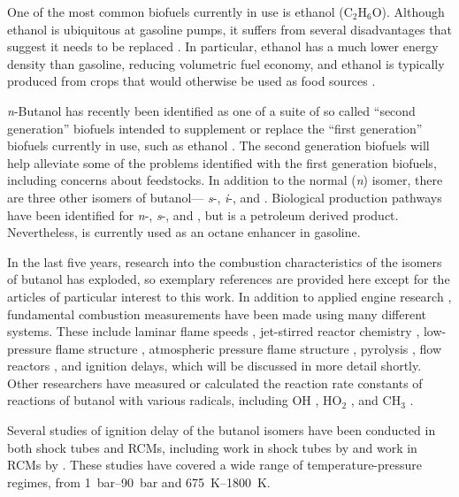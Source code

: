 \documentclass[../main.tex]{subfiles}
\begin{document}
One of the most common biofuels currently in use is ethanol (C$_2$H$_6$O).
Although ethanol is ubiquitous at gasoline pumps, it suffers from several
disadvantages that suggest it needs to be replaced \cite{Niven2005}. In particular, ethanol
has a much lower energy density than gasoline, reducing volumetric fuel
economy, and ethanol is typically produced from crops that would otherwise
be used as food sources \cite{Somma2009}.

\textit{n}-Butanol has recently been identified as one of a suite of so
called ``second generation'' biofuels intended to supplement or replace
the ``first generation'' biofuels currently in use, such as ethanol \cite{Harvey2011,Nigam2011}.
The second generation biofuels will help alleviate some of the problems
identified with the first generation biofuels, including concerns about
feedstocks. In addition to the normal (\textit{n}) isomer, there are three
other isomers of butanol--- \textit{s}-, \textit{i}-, and \tBuOH{}.
Biological production pathways have been identified for \textit{n}-, \textit{s}-,
and \iBuOH{} \cite{Nigam2011,Smith2010}, but \tBuOH{} is a petroleum derived product.
Nevertheless, \tBuOH{} is currently used as an octane enhancer in gasoline.

In the last five years, research into the combustion characteristics of
the isomers of butanol has exploded, so exemplary references are
provided here except for the articles of particular interest to this work.
In addition to applied engine research \cite{Dernotte2009, Szwaja2010, Kim2011},
fundamental combustion measurements have been made using many different
systems. These include laminar flame speeds \cite{Veloo2011a}, jet-stirred reactor
chemistry \cite{Dagaut2009}, low-pressure flame structure \cite{Hansen2011a,Hansen2013},
atmospheric pressure flame structure \cite{Grana2010}, pyrolysis \cite{VanGeem2010, Cai2012, Cai2013},
flow reactors \cite{Lefkowitz2012,Heyne2013}, and ignition delays, which will be discussed
in more detail shortly. Other researchers have measured or calculated the reaction
rate constants of reactions of butanol with various radicals, including OH \cite{Stranic2013a,
Pang2012, Pang2012a, Seal2013, Pang2012b, El-Nahas2012, Zhou2011, Moc2010, Vasu2010}, HO$_2$
\cite{Zhou2012, Alecu2012, Black2010a}, and CH$_3$ \cite{Katsikadakos2013, Katsikadakos2012}.

Several studies of ignition delay of the butanol isomers have been conducted
in both shock tubes and RCMs, including work in shock tubes by \textcite{Moss2008,
Black2010, Noorani2010, Zhang2012, Stranic2012, Yasunaga2012, Heufer2011,
Vranckx2011, Zhu2014} and work in RCMs by \textcite{Weber2011,
Weber2013, Weber2013a, Karwat2011a}. These studies have covered a wide range of
temperature-pressure regimes, from \SIrange{1}{90}{\bar} and \SIrange{675}{1800}{\kelvin}.
\end{document}
